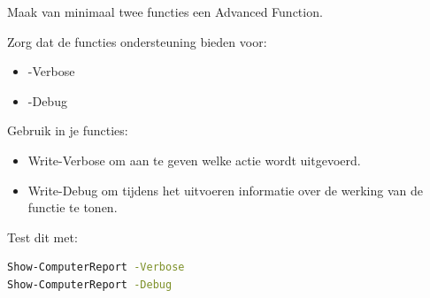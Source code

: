 Maak van minimaal twee functies een Advanced Function.

Zorg dat de functies ondersteuning bieden voor:
\begin{itemize}
\item -Verbose
\item -Debug
\end{itemize}

Gebruik in je functies:
\begin{itemize}
\item Write-Verbose om aan te geven welke actie wordt uitgevoerd.
\item Write-Debug om tijdens het uitvoeren informatie over de werking van de functie te tonen.
\end{itemize}

Test dit met:
\begin{lstlisting}[language=bash]
Show-ComputerReport -Verbose
Show-ComputerReport -Debug
\end{lstlisting}

